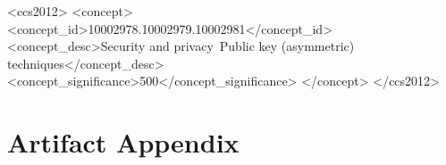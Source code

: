 \documentclass[sigconf]{acmart}
\begin{document}
		
		
	
	
	\begin{CCSXML}
		<ccs2012>
		<concept>
		<concept_id>10002978.10002979.10002981</concept_id>
		<concept_desc>Security and privacy~Public key (asymmetric) techniques</concept_desc>
		<concept_significance>500</concept_significance>
		</concept>
		</ccs2012>
	\end{CCSXML}
	
	
	
	
	
	
%



\maketitle

\appendix

\section{Artifact Appendix}
\end{document}
